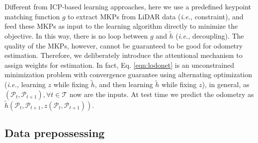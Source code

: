 \documentclass[sigconf]{acmart}
\def\ie{\emph{i.e., }}
\def\lidar{LiDAR}
\begin{document}
Different from ICP-based learning approaches, here we use a predefined keypoint matching function $g$ to extract MKPs from \lidar{} data (\ie constraint), and feed these MKPs as input to the learning algorithm directly to minimize the objective. In this way, there is no loop between $g$ and $\tilde{h}$ (\ie decoupling). The quality of the MKPs, however, cannot be guaranteed to be good for odometry estimation. Therefore, we deliberately introduce the attentional mechanism to assign weights for estimation. In fact, Eq. \ref{eqn:lodonet} is an unconstrained minimization problem with convergence guarantee using alternating optimization (\ie learning $z$ while fixing $\tilde{h}$, and then learning $\tilde{h}$ while fixing $z$), in general, as $(\mathcal{P}_t, \mathcal{P}_{t+1}), \forall t\in\mathcal{T}$ now are the inputs. At test time we predict the odometry as $\tilde{h}(\mathcal{P}_{t}, \mathcal{P}_{t+1}, z(\mathcal{P}_{t}, \mathcal{P}_{t+1}))$.

\subsection{Data prepossessing}
\label{section:Data prepossessing}

\end{document}
